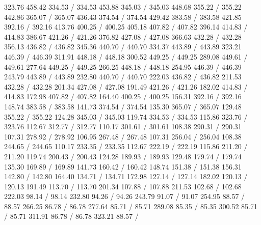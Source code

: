 { 323.76 458.42 334.53 /
 334.53 453.88 345.03 /
 345.03 448.68 355.22 /
 355.22 442.86 365.07 /
 365.07 436.43 374.54 /
 374.54 429.42 383.58 /
 383.58 421.85 392.16 /
 392.16 413.76 400.25 /
 400.25 405.18 407.82 /
 407.82 396.14 414.83 /
 414.83 386.67 421.26 /
 421.26 376.82 427.08 /
 427.08 366.63 432.28 /
 432.28 356.13 436.82 /
 436.82 345.36 440.70 /
 440.70 334.37 443.89 /
 443.89 323.21 446.39 /
 446.39 311.91 448.18 /
 448.18 300.52 449.25 /
 449.25 289.08 449.61 /
 449.61 277.64 449.25 /
 449.25 266.25 448.18 /
 448.18 254.95 446.39 /
 446.39 243.79 443.89 /
 443.89 232.80 440.70 /
 440.70 222.03 436.82 /
 436.82 211.53 432.28 /
 432.28 201.34 427.08 /
 427.08 191.49 421.26 /
 421.26 182.02 414.83 /
 414.83 172.98 407.82 /
 407.82 164.40 400.25 /
 400.25 156.31 392.16 /
 392.16 148.74 383.58 /
 383.58 141.73 374.54 /
 374.54 135.30 365.07 /
 365.07 129.48 355.22 /
 355.22 124.28 345.03 /
 345.03 119.74 334.53 /
 334.53 115.86 323.76 /
 323.76 112.67 312.77 /
 312.77 110.17 301.61 /
 301.61 108.38 290.31 /
 290.31 107.31 278.92 /
 278.92 106.95 267.48 /
 267.48 107.31 256.04 /
 256.04 108.38 244.65 /
 244.65 110.17 233.35 /
 233.35 112.67 222.19 /
 222.19 115.86 211.20 /
 211.20 119.74 200.43 /
 200.43 124.28 189.93 /
 189.93 129.48 179.74 /
 179.74 135.30 169.89 /
 169.89 141.73 160.42 /
 160.42 148.74 151.38 /
 151.38 156.31 142.80 /
 142.80 164.40 134.71 /
 134.71 172.98 127.14 /
 127.14 182.02 120.13 /
 120.13 191.49 113.70 /
 113.70 201.34 107.88 /
 107.88 211.53 102.68 /
 102.68 222.03 98.14 /
 98.14 232.80 94.26 /
 94.26 243.79 91.07 /
 91.07 254.95 88.57 /
 88.57 266.25 86.78 /
 86.78 277.64 85.71 /
 85.71 289.08 85.35 /
 85.35 300.52 85.71 /
 85.71 311.91 86.78 /
 86.78 323.21 88.57 /
}
